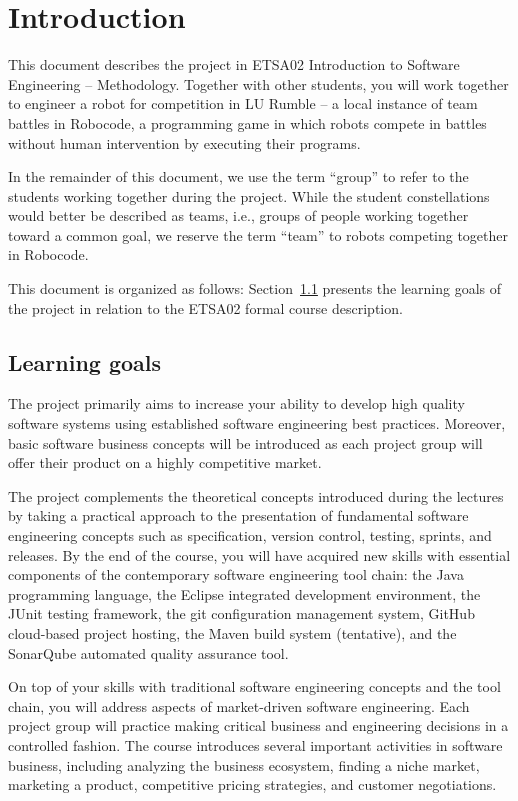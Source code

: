 \documentclass{scrreprt}
\begin{document}
\chapter{Introduction}
This document describes the project in ETSA02 Introduction to Software Engineering -- Methodology. Together with other students, you will work together to engineer a robot for competition in LU Rumble -- a local instance of team battles in Robocode, a programming game in which robots compete in battles without human intervention by executing their programs.

In the remainder of this document, we use the term ``group'' to refer to the students working together during the project. While the student constellations would better be described as teams, i.e., groups of people working together toward a common goal, we reserve the term ``team'' to robots competing together in Robocode.

This document is organized as follows: Section~\ref{sec:goals} presents the learning goals of the project in relation to the ETSA02 formal course description.

\section{Learning goals} \label{sec:goals}
The project primarily aims to increase your ability to develop high quality software systems using established software engineering best practices. Moreover, basic software business concepts will be introduced as each project group will offer their product on a highly competitive market.

The project complements the theoretical concepts introduced during the lectures by taking a practical approach to the presentation of fundamental software engineering concepts such as specification, version control, testing, sprints, and releases. By the end of the course, you will have acquired new skills with essential components of the contemporary software engineering tool chain: the Java programming language, the Eclipse integrated development environment, the JUnit testing framework, the git configuration management system, GitHub cloud-based project hosting, the Maven build system (tentative), and the SonarQube automated quality assurance tool.

On top of your skills with traditional software engineering concepts and the tool chain, you will address aspects of market-driven software engineering. Each project group will practice making critical business and engineering decisions in a controlled fashion. The course introduces several important activities in software business, including analyzing the business ecosystem, finding a niche market, marketing a product, competitive pricing strategies, and customer negotiations.
\end{document}
